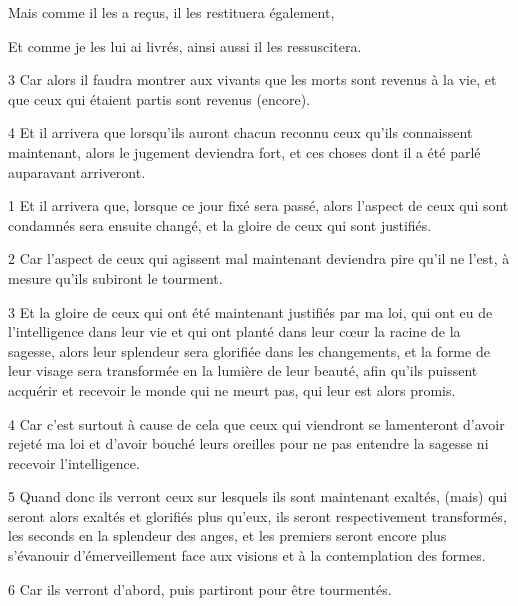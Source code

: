 \par Mais comme il les a reçus, il les restituera également,

\par Et comme je les lui ai livrés, ainsi aussi il les ressuscitera.

\par 3 Car alors il faudra montrer aux vivants que les morts sont revenus à la vie, et que ceux qui étaient partis sont revenus (encore).

\par 4 Et il arrivera que lorsqu'ils auront chacun reconnu ceux qu'ils connaissent maintenant, alors le jugement deviendra fort, et ces choses dont il a été parlé auparavant arriveront.


\par 1 Et il arrivera que, lorsque ce jour fixé sera passé, alors l'aspect de ceux qui sont condamnés sera ensuite changé, et la gloire de ceux qui sont justifiés.

\par 2 Car l'aspect de ceux qui agissent mal maintenant deviendra pire qu'il ne l'est, à mesure qu'ils subiront le tourment.

\par 3 Et la gloire de ceux qui ont été maintenant justifiés par ma loi, qui ont eu de l'intelligence dans leur vie et qui ont planté dans leur cœur la racine de la sagesse, alors leur splendeur sera glorifiée dans les changements, et la forme de leur visage sera transformée en la lumière de leur beauté, afin qu'ils puissent acquérir et recevoir le monde qui ne meurt pas, qui leur est alors promis.

\par 4 Car c'est surtout à cause de cela que ceux qui viendront se lamenteront d'avoir rejeté ma loi et d'avoir bouché leurs oreilles pour ne pas entendre la sagesse ni recevoir l'intelligence.

\par 5 Quand donc ils verront ceux sur lesquels ils sont maintenant exaltés, (mais) qui seront alors exaltés et glorifiés plus qu'eux, ils seront respectivement transformés, les seconds en la splendeur des anges, et les premiers seront encore plus s'évanouir d'émerveillement face aux visions et à la contemplation des formes.

\par 6 Car ils verront d'abord, puis partiront pour être tourmentés.

